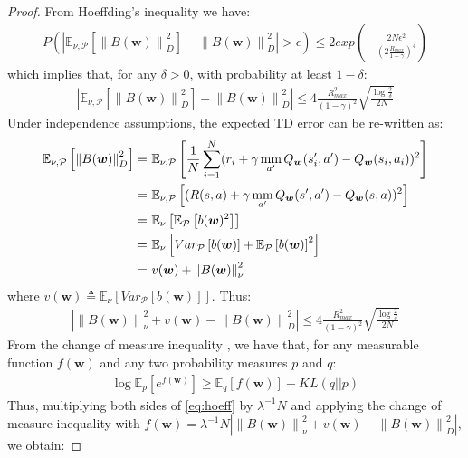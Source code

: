 \documentclass{article}
\newcommand{\mm}{\operatornamewithlimits{mm}}
\newcommand{\norm}[1]{\left\lVert #1 \right\rVert}
\newcommand{\abs}[1]{\left\lvert #1 \right\rvert}
\begin{document}
\begin{proof}
From Hoeffding's inequality we have:
\begin{align*}
P\left( \abs{\mathbb{E}_{\nu,\mathcal{P}}\left[\norm{B(\bm{w})}_D^2\right] - \norm{B(\bm{w})}_D^2} > \epsilon \right) \leq 2exp\left( -\frac{2N\epsilon^2}{\left(2\frac{R_{max}}{1-\gamma}\right)^4} \right)
\end{align*}
which implies that, for any $\delta>0$, with probability at least $1-\delta$:
\begin{align*}
\abs{\mathbb{E}_{\nu,\mathcal{P}}\left[\norm{B(\bm{w})}_D^2\right] - \norm{B(\bm{w})}_D^2} \leq 4\frac{R_{max}^2}{(1-\gamma)^2}\sqrt{\frac{\log\frac{2}{\delta}}{2N}}
\end{align*}
Under independence assumptions, the expected TD error can be re-written as:
\begin{align*}
\mathbb{E}_{\nu,\mathcal{P}}\left[\norm{B(\bm{w})}_D^2\right] =\ & \mathbb{E}_{\nu,\mathcal{P}}\left[\frac{1}{N}\sum_{i=1}^N (r_i + \gamma \mm_{a'} Q_{\bm{w}}(s_i',a') - Q_{\bm{w}}(s_i,a_i))^2\right]\\ =\ & \mathbb{E}_{\nu,\mathcal{P}}\left[(R(s,a) + \gamma \mm_{a'} Q_{\bm{w}}(s',a') - Q_{\bm{w}}(s,a))^2\right]\\ =\ & \mathbb{E}_{\nu}\left[\mathbb{E}_{\mathcal{P}}\left[b(\bm{w})^2\right]\right]\\ =\ & \mathbb{E}_{\nu}\left[Var_{\mathcal{P}}\left[b(\bm{w})\right] + \mathbb{E}_{\mathcal{P}}\left[b(\bm{w})\right]^2\right]\\ =\ & v(\bm{w}) + \norm{B(\bm{w})}_{\nu}^2
\end{align*}
where $v(\bm{w}) \triangleq \mathbb{E}_{\nu}\left[Var_{\mathcal{P}}\left[b(\bm{w})\right]\right]$. Thus:
\begin{align}\label{eq:hoeff}
\abs{\norm{B(\bm{w})}_{\nu}^2 + v(\bm{w}) - \norm{B(\bm{w})}_D^2} \leq 4\frac{R_{max}^2}{(1-\gamma)^2}\sqrt{\frac{\log\frac{2}{\delta}}{2N}}
\end{align}
From the change of measure inequality \cite{}, we have that, for any measurable function $f(\bm{w})$ and any two probability measures $p$ and $q$:
\begin{align*}
\log\mathbb{E}_p\left[e^{f(\bm{w})}\right] \geq \mathbb{E}_q\left[ f(\bm{w}) \right] - KL(q||p)
\end{align*}
Thus, multiplying both sides of \eqref{eq:hoeff} by $\lambda^{-1}N$ and applying the change of measure inequality with $f(\bm{w}) = \lambda^{-1}N\abs{\norm{B(\bm{w})}_{\nu}^2 + v(\bm{w}) - \norm{B(\bm{w})}_D^2}$, we obtain:

\end{proof}
\end{document}
